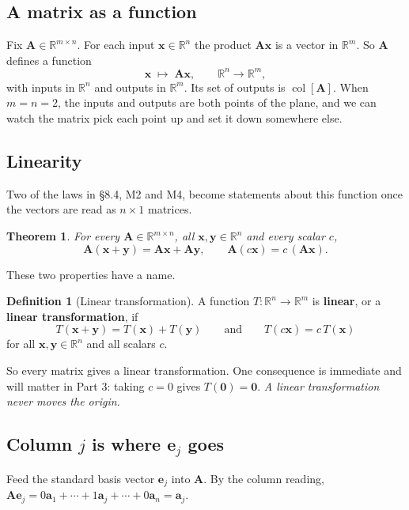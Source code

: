 \documentclass[11pt]{article}
\theoremstyle{plain}
\newtheorem{thm}{Theorem}[section]
\theoremstyle{definition}
\newtheorem{defn}{Definition}[section]
\theoremstyle{remark}
\newcommand{\R}{\mathbb{R}}
\newcommand{\vc}[1]{\mathbf{#1}}        %
\newcommand{\mt}[1]{\mathbf{#1}}        %
\newcommand{\colsp}[1]{\operatorname{col}[#1]}
\begin{document}
\subsection{A matrix as a function}
Fix $\mt{A}\in\R^{m\times n}$. For each input $\vc{x}\in\R^{n}$ the product
$\mt{A}\vc{x}$ is a vector in $\R^{m}$. So $\mt{A}$ defines a function
\[
  \vc{x}\;\longmapsto\;\mt{A}\vc{x},
  \qquad
  \R^{n}\longrightarrow\R^{m},
\]
with inputs in $\R^{n}$ and outputs in $\R^{m}$. Its set of outputs is
$\colsp{\mt{A}}$. When $m=n=2$, the inputs and outputs are both points of the
plane, and we can watch the matrix pick each point up and set it down
somewhere else.

\subsection{Linearity}
Two of the laws in \S8.4, M2 and M4, become statements about this function once
the vectors are read as $n\times1$ matrices.

\begin{thm}
\label{thm:linear}
For every $\mt{A}\in\R^{m\times n}$, all $\vc{x},\vc{y}\in\R^{n}$ and every
scalar $c$,
\[
  \mt{A}(\vc{x}+\vc{y}) = \mt{A}\vc{x}+\mt{A}\vc{y},
  \qquad
  \mt{A}(c\vc{x}) = c\,(\mt{A}\vc{x}) .
\]
\end{thm}

\noindent These two properties have a name.

\begin{defn}[Linear transformation]
A function $T:\R^{n}\to\R^{m}$ is \textbf{linear}, or a \textbf{linear
transformation}, if
\[
  T(\vc{x}+\vc{y}) = T(\vc{x})+T(\vc{y})
  \qquad\text{and}\qquad
  T(c\vc{x}) = c\,T(\vc{x})
\]
for all $\vc{x},\vc{y}\in\R^{n}$ and all scalars $c$.
\end{defn}

\noindent So every matrix gives a linear transformation. One consequence is
immediate and will matter in Part 3: taking $c=0$ gives $T(\vc{0})=\vc{0}$.
\emph{A linear transformation never moves the origin.}

\subsection{Column \texorpdfstring{$j$}{j} is where \texorpdfstring{$\vc{e}_j$}{e\_j} goes}
Feed the standard basis vector $\vc{e}_j$ into $\mt{A}$. By the column
reading, $\mt{A}\vc{e}_j=0\vc{a}_1+\cdots+1\vc{a}_j+\cdots+0\vc{a}_n=\vc{a}_j$.
\end{document}
